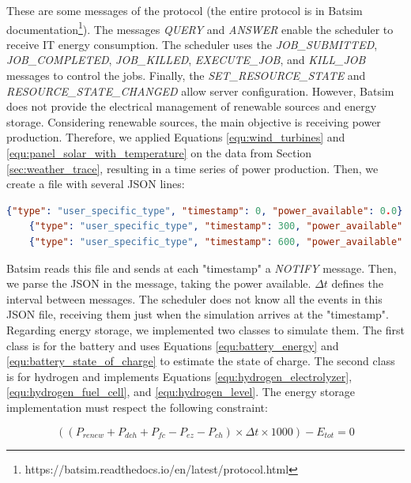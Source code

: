 These are some messages of the protocol (the entire protocol is in Batsim documentation\footnote{https://batsim.readthedocs.io/en/latest/protocol.html}). The messages \textit{QUERY} and \textit{ANSWER} enable the scheduler to receive IT energy consumption. The scheduler uses the \textit{JOB\_SUBMITTED}, \textit{JOB\_COMPLETED}, \textit{JOB\_KILLED}, \textit{EXECUTE\_JOB}, and \textit{KILL\_JOB} messages to control the jobs. Finally, the \textit{SET\_RESOURCE\_STATE} and \textit{RESOURCE\_STATE\_CHANGED} allow server configuration. However, Batsim does not provide the electrical management of renewable sources and energy storage. Considering renewable sources, the main objective is receiving power production. Therefore, we applied Equations \ref{equ:wind_turbines} and \ref{equ:panel_solar_with_temperature} on the data from Section \ref{sec:weather_trace}, resulting in a time series of power production. Then, we create a file with several JSON lines:

\begin{lstlisting}[language=json,firstnumber=1]
    {"type": "user_specific_type", "timestamp": 0, "power_available": 0.0}
    {"type": "user_specific_type", "timestamp": 300, "power_available": 460.4}
    {"type": "user_specific_type", "timestamp": 600, "power_available": 5172.26}
\end{lstlisting}

Batsim reads this file and sends at each "timestamp" a \textit{NOTIFY} message. Then, we parse the JSON in the message, taking the power available. $\Delta t$ defines the interval between messages. The scheduler does not know all the events in this JSON file, receiving them just when the simulation arrives at the "timestamp". Regarding energy storage, we implemented two classes to simulate them. The first class is for the battery and uses Equations \ref{equ:battery_energy} and \ref{equ:battery_state_of_charge} to estimate the state of charge. The second class is for hydrogen and implements Equations \ref{equ:hydrogen_electrolyzer}, \ref{equ:hydrogen_fuel_cell}, and \ref{equ:hydrogen_level}. The energy storage implementation must respect the following constraint:

\begin{equation}
    \label{equ:energy_diff}
    ((P_{renew} + P_{dch} + P_{fc} - P_{ez} - P_{ch}) \times \Delta t \times 1000) - E_{tot} = 0
\end{equation}

